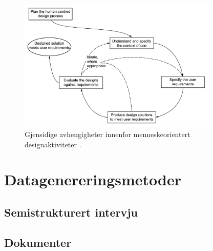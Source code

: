 \begin{figure}
\centering
\includegraphics[width=0.85\textwidth]{fig/iso9241-210}
\caption{Gjensidige avhengigheter innenfor menneskeorientert designaktiviteter \citep{dis20099241}.}
\label{fig:iso9241-210}
\end{figure}

\section{Datagenereringsmetoder}
\blindtext

\subsection{Semistrukturert intervju}
\blindtext

\subsection{Dokumenter}
\blindtext